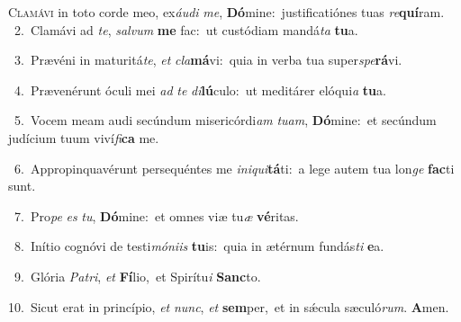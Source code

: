 \lettrine{\initial\textcolor{\initialcolor}{C}}{lamávi} in toto corde meo, ex\-\textit{áu}\-\textit{di} \textit{me}\-, \textbf{Dó}\-mine:~\star justificatiónes tuas \textit{re}\-\textbf{quí}ram.\\
{\numbfont\textcolor{\numbcolor}{~2.}}~Clamávi ad \textit{te}\-, \textit{sal}\-\textit{vum} \textbf{me} fac:~\star ut custódiam mandá\textit{ta} \textbf{tu}\-a.\par
{\numbfont\textcolor{\numbcolor}{~3.}}~Prævéni in maturitá\-\textit{te}\-, \textit{et} \textit{cla}\-\textbf{má}vi:~\star quia in verba tua super\-\textit{spe}\-\textbf{rá}vi.\par
{\numbfont\textcolor{\numbcolor}{~4.}}~Prævenérunt óculi mei \textit{ad} \textit{te} \textit{di}\-\textbf{lú}culo:~\star ut meditárer elóqui\textit{a} \textbf{tu}\-a.\par
{\numbfont\textcolor{\numbcolor}{~5.}}~Vocem meam audi secúndum misericórdi\textit{am} \textit{tu}\-\textit{am}, \textbf{Dó}\-mine:~\star et secúndum judícium tuum viví\-\textit{fi}\-\textbf{ca} me.\par
{\numbfont\textcolor{\numbcolor}{~6.}}~Appropinquavérunt persequéntes me \textit{in}\-\textit{i}\textit{qui}\textbf{tá}ti:~\star a lege autem tua lon\textit{ge} \textbf{fac}\-ti sunt.\par
{\numbfont\textcolor{\numbcolor}{~7.}}~Pro\textit{pe} \textit{es} \textit{tu}\-, \textbf{Dó}\-mine:~\star et omnes viæ tu\textit{æ} \textbf{vé}\-ritas.\par
{\numbfont\textcolor{\numbcolor}{~8.}}~Inítio cognóvi de testi\-\textit{mó}\-\textit{ni}\textit{is} \textbf{tu}\-is:~\star quia in ætérnum fundás\textit{ti} \textbf{e}\-a.\par
{\numbfont\textcolor{\numbcolor}{~9.}}~Glória \textit{Pa}\-\textit{tri}, \textit{et} \textbf{Fí}\-lio,~\star et Spirítu\textit{i} \textbf{Sanc}\-to.\par
{\numbfont\textcolor{\numbcolor}{10.}}~Sicut erat in princípio, \textit{et} \textit{nunc}\-, \textit{et} \textbf{sem}\-per,~\star et in sǽcula sæculó\-\textit{rum}\-. \textbf{A}\-men.\par
